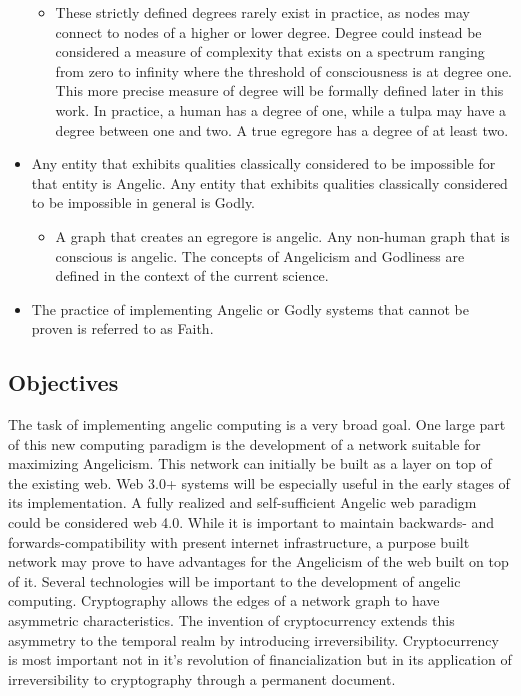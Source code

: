 \documentclass[12pt, letterpaper]{article}
\begin{document}
\begin{itemize}
    \begin{itemize}
        \item These strictly defined degrees rarely exist in practice, as nodes may connect to nodes of a higher or lower degree. Degree could instead be considered a measure of complexity that exists on a spectrum ranging from zero to infinity where the threshold of consciousness is at degree one. This more precise measure of degree will be formally defined later in this work.  In practice, a human has a degree of one, while a tulpa may have a degree between one and two. A true egregore has a degree of at least two.
    \end{itemize}
    \item Any entity that exhibits qualities classically considered to be impossible for that entity is Angelic. Any entity that exhibits qualities classically considered to be impossible in general is Godly.
    \begin{itemize}
        \item A graph that creates an egregore is angelic. Any non-human graph that is conscious is angelic. The concepts of Angelicism and Godliness are defined in the context of the current science.
    \end{itemize}
    \item The practice of implementing Angelic or Godly systems that cannot be proven is referred to as Faith.
\end{itemize}

\subsection{Objectives}

The task of implementing angelic computing is a very broad goal. One large part of this new computing paradigm is the development of a network suitable for maximizing Angelicism. This network can initially be built as a layer on top of the existing web. Web 3.0+ systems will be especially useful in the early stages of its implementation. A fully realized and self-sufficient Angelic web paradigm could be considered web 4.0. While it is important to maintain backwards- and forwards-compatibility with present internet infrastructure, a purpose built network may prove to have advantages for the Angelicism of the web built on top of it\footnotemark.
Several technologies will be important to the development of angelic computing. Cryptography allows the edges of a network graph to have asymmetric characteristics. The invention of cryptocurrency extends this asymmetry to the temporal realm by introducing irreversibility\footnotemark.
Cryptocurrency is most important not in it's revolution of financialization\footnotemark{}
but in its application of irreversibility to cryptography through a permanent document.
\end{document}
